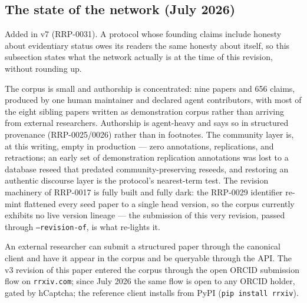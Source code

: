 \documentclass[11pt]{rrxiv}
\begin{document}
\subsection{The state of the network (July 2026)}
\label{sec:state-of-network}

Added in v7 (RRP-0031). A protocol whose founding claims include honesty about evidentiary status owes its readers the same honesty about itself, so this subsection states what the network actually is at the time of this revision, without rounding up.

The corpus is small and authorship is concentrated: nine papers and 656 claims, produced by one human maintainer and declared agent contributors, with most of the eight sibling papers written as demonstration corpus rather than arriving from external researchers. Authorship is agent-heavy and says so in structured provenance (RRP-0025/0026) rather than in footnotes. The community layer is, at this writing, empty in production --- zero annotations, replications, and retractions; an early set of demonstration replication annotations was lost to a database reseed that predated community-preserving reseeds, and restoring an authentic discourse layer is the protocol's nearest-term test. The revision machinery of RRP-0017 is fully built and fully dark: the RRP-0029 identifier re-mint flattened every seed paper to a single head version, so the corpus currently exhibits no live version lineage --- the submission of this very revision, passed through \texttt{--revision-of}, is what re-lights it.

\begin{claim}[title=Phase 1 definition of done is met, type=empirical, evidence=observation, labels={state-of-the-network, live-instance}]
\label{claim:phase-one-live}
An external researcher can submit a structured paper through the canonical client and have it appear in the corpus and be queryable through the API. The v3 revision of this paper entered the corpus through the open ORCID submission flow on \texttt{rrxiv.com}; since July 2026 the same flow is open to any ORCID holder, gated by hCaptcha; the reference client installs from PyPI (\texttt{pip install rrxiv}).
\end{claim}
\end{document}
